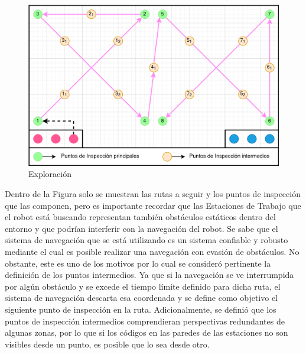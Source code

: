\begin{figure}[ht]
    \centering
    \includegraphics[scale= 0.3]{Figures/Exploration_route.png}
        \caption{Exploración}
        \label{fig:Route_Exploration}
    \end{figure}

Dentro de la Figura solo se muestran las rutas a seguir y los puntos de inspección que las componen, pero es importante recordar que las Estaciones de Trabajo que el robot está buscando representan también obstáculos estáticos dentro del entorno y que podrían interferir con la navegación del robot. Se sabe que el sistema de navegación que se está utilizando es un sistema confiable y robusto mediante el cual es posible realizar una navegación con evasión de obstáculos. 
No obstante, este es uno de los motivos por lo cual se consideró pertinente la definición de los puntos intermedios. Ya que si la navegación se ve interrumpida por  algún obstáculo y se excede el tiempo límite definido para dicha ruta, el sistema de navegación descarta esa coordenada y se define como objetivo el siguiente punto de inspección en la ruta. Adicionalmente, se definió que los puntos de inspección intermedios comprendieran perspectivas redundantes de algunas zonas, por lo que si los códigos en las paredes de las estaciones no son visibles desde un punto, es posible que lo sea desde otro.

